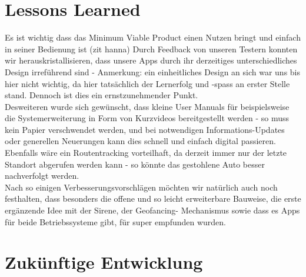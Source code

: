 \section{Lessons Learned}
Es ist wichtig dass das Minimum Viable Product einen Nutzen bringt und einfach in seiner Bedienung ist (zit hanna)
Durch Feedback von unseren Testern konnten wir herauskristallisieren, dass unsere Apps durch ihr derzeitiges unterschiedliches Design irreführend sind - Anmerkung: ein einheitliches Design an sich war uns bis hier nicht wichtig, da hier tatsächlich der Lernerfolg und -spass an erster Stelle stand. Dennoch ist dies ein ernstzunehmender Punkt.
\\
Desweiteren wurde sich gewünscht, dass kleine User Manuals für beispielsweise die Systemerweiterung in Form von Kurzvideos bereitgestellt werden - so muss kein Papier verschwendet werden, und bei notwendigen Informations-Updates oder generellen Neuerungen kann dies schnell und einfach digital passieren. Ebenfalls wäre ein Routentracking vorteilhaft, da derzeit immer nur der letzte Standort abgerufen werden kann - so könnte das gestohlene Auto besser nachverfolgt werden. 
\\
Nach so einigen Verbesserungsvorschlägen möchten wir natürlich auch noch festhalten, dass besonders die offene und so leicht erweiterbare Bauweise, die erste ergänzende Idee mit der Sirene, der Geofancing- Mechanismus sowie dass es Apps für beide Betriebssysteme gibt, für super empfunden wurden.



\section{Zukünftige Entwicklung}


